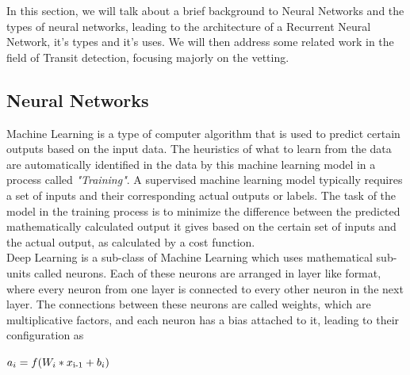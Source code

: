 



In this section, we will talk about a brief background to Neural Networks and the types of neural networks, leading to the architecture of a Recurrent Neural Network, it's types and it's uses. We will then address some related work in the field of Transit detection, focusing majorly on the vetting. 
\subsection{Neural Networks}
Machine Learning is a type of computer algorithm that is used to predict certain outputs based on the input data. The heuristics of what to learn from the data are automatically identified in the data by this machine learning model in a process called \emph{"Training"}. A supervised machine learning model typically requires a set of inputs and their corresponding actual outputs or labels. The task of the model in the training process is to minimize the difference between the predicted mathematically calculated output it gives based on the certain set of inputs and the actual output, as calculated by a cost function.\\

Deep Learning is a sub-class of Machine Learning which uses mathematical sub-units called neurons. Each of these neurons are arranged in layer like format, where every neuron from one layer is connected to every other neuron in the next layer. The connections between these neurons are called weights, which are multiplicative factors, and each neuron has a bias attached to it, leading to their configuration as
\begin{center}
$a_i = f(W_i * x\textsubscript{i-1} + b_i)$
\end{center}

